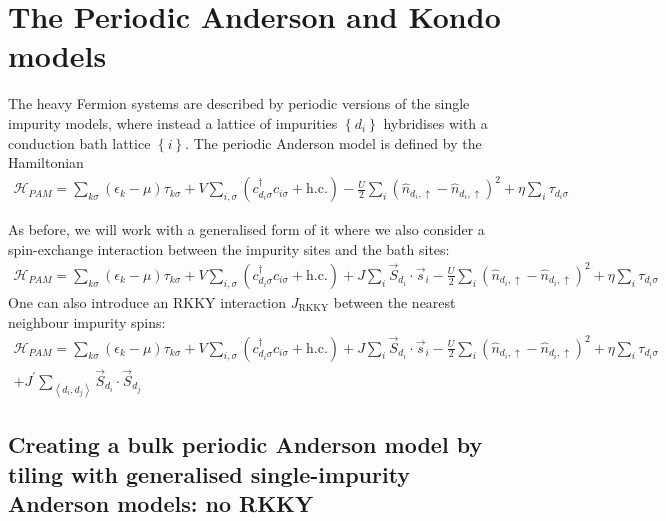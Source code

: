 \documentclass{report}
\numberwithin{equation}{section}
\begin{document}
\chapter{The Periodic Anderson and Kondo models}
The heavy Fermion systems are described by periodic versions of the single impurity models, where instead a lattice of impurities \(\left\{ d_i \right\} \) hybridises with a conduction bath lattice \(\left\{ i \right\} \). The periodic Anderson model is defined by the Hamiltonian
\begin{equation}\begin{aligned}
	\mathcal{H}_{PAM} = \sum_{k\sigma} \left(\epsilon_k - \mu\right)\tau_{k\sigma} + V\sum_{i,\sigma} \left(c^\dagger_{d_i\sigma}c_{i\sigma} + \text{h.c.} \right)  - \frac{U}{2}\sum_i \left(\hat n_{d_i,\uparrow} - \hat n_{d_i,\uparrow}\right)^2 + \eta \sum_i\tau_{d_i\sigma}
\end{aligned}\end{equation}

As before, we will work with a generalised form of it where we also consider a spin-exchange interaction between the impurity sites and the bath sites:
\begin{equation}\begin{aligned}
	\mathcal{H}_{PAM} = \sum_{k\sigma} \left(\epsilon_k - \mu\right)\tau_{k\sigma} + V\sum_{i,\sigma} \left(c^\dagger_{d_i\sigma}c_{i\sigma} + \text{h.c.} \right) + J \sum_i \vec{S}_{d_i}\cdot\vec{s}_i - \frac{U}{2}\sum_i \left(\hat n_{d_i,\uparrow} - \hat n_{d_i,\uparrow}\right)^2 + \eta \sum_i\tau_{d_i\sigma}
\end{aligned}\end{equation}
One can also introduce an RKKY interaction \(J_\text{RKKY}\) between the nearest neighbour impurity spins:
\begin{equation}\begin{aligned}
	\mathcal{H}_{PAM} = \sum_{k\sigma} \left(\epsilon_k - \mu\right)\tau_{k\sigma} + V\sum_{i,\sigma} \left(c^\dagger_{d_i\sigma}c_{i\sigma} + \text{h.c.} \right) + J \sum_i \vec{S}_{d_i}\cdot\vec{s}_i - \frac{U}{2}\sum_i \left(\hat n_{d_i,\uparrow} - \hat n_{d_i,\uparrow}\right)^2 + \eta \sum_i\tau_{d_i\sigma} \\
	+ J^\prime\sum_{\left<d_i,d_j \right>}\vec{S}_{d_i}\cdot\vec{S}_{d_j}
\end{aligned}\end{equation}

\section{Creating a bulk periodic Anderson model by tiling with generalised single-impurity Anderson models: no RKKY}
\end{document}
